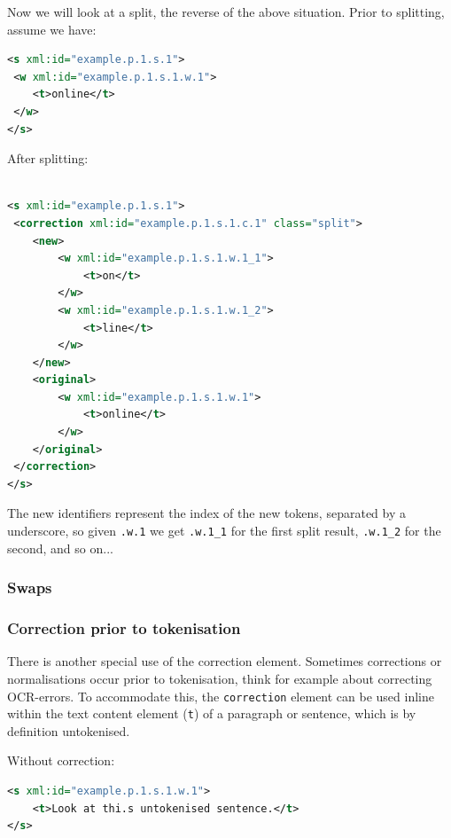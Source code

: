 \documentclass[a4paper,12pt]{report}
\begin{document}
Now we will look at a split, the reverse of the above situation. Prior to splitting, assume we have:

\begin{lstlisting}[language=xml]
<s xml:id="example.p.1.s.1">
 <w xml:id="example.p.1.s.1.w.1">
    <t>online</t>
 </w>                         
</s>
\end{lstlisting}

After splitting:

\begin{lstlisting}[language=xml]

<s xml:id="example.p.1.s.1">
 <correction xml:id="example.p.1.s.1.c.1" class="split">
    <new>    
        <w xml:id="example.p.1.s.1.w.1_1">
            <t>on</t>
        </w>
        <w xml:id="example.p.1.s.1.w.1_2">
            <t>line</t>
        </w>                        
    </new>
    <original>
        <w xml:id="example.p.1.s.1.w.1">
            <t>online</t>
        </w>
    </original>
 </correction>               
</s>
\end{lstlisting}

The new identifiers represent the index of the new tokens, separated by a underscore, so given \texttt{.w.1}  we get \texttt{.w.1\_1} for the first split result, \texttt{.w.1\_2} for the second, and so on...


\subsubsection{Swaps}


\subsubsection{Correction prior to tokenisation} 

There is another special use of the correction element. Sometimes corrections or normalisations occur prior to tokenisation, think for example about correcting OCR-errors. To accommodate this, the \texttt{correction} element can be used inline within the text content element (\texttt{t}) of a paragraph or sentence, which is by definition untokenised.

Without correction:

\begin{lstlisting}[language=xml]
<s xml:id="example.p.1.s.1.w.1">
    <t>Look at thi.s untokenised sentence.</t>
</s>            
\end{lstlisting}
\end{document}

